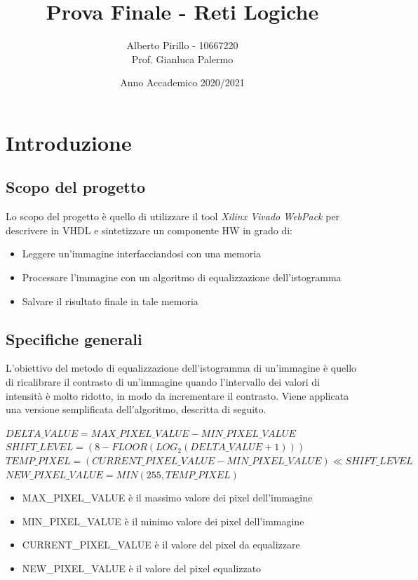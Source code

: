 \documentclass[a4paper, 12pt]{article}
\title{\Huge{Prova Finale - Reti Logiche}}
\author{\Large{Alberto Pirillo - 10667220} \\ \Large{Prof. Gianluca Palermo}}
\date{Anno Accademico 2020/2021}
\begin{document}
\maketitle
\tableofcontents
{}
\pagebreak

\section{Introduzione}
\subsection{Scopo del progetto}
Lo scopo del progetto è quello di utilizzare il tool \textit{Xilinx Vivado WebPack} per  descrivere in VHDL e sintetizzare un componente HW in grado di:
\begin{itemize}
    \item Leggere un'immagine interfacciandosi con una memoria
    \item Processare l'immagine con un algoritmo di equalizzazione dell'istogramma
    \item Salvare il risultato finale in tale memoria
\end{itemize}

\subsection{Specifiche generali}
L'obiettivo del metodo di equalizzazione dell'istogramma di un'immagine è quello di ricalibrare il contrasto di un'immagine quando l'intervallo dei valori di intensità è molto ridotto, in modo da incrementare il contrasto. Viene applicata una versione semplificata dell'algoritmo, descritta di seguito.

\bigskip\footnotesize
$DELTA\_VALUE = MAX\_PIXEL\_VALUE - MIN\_PIXEL\_VALUE$ \\
$SHIFT\_LEVEL = (8-FLOOR(LOG_2(DELTA\_VALUE + 1)))$ \\
$TEMP\_PIXEL = (CURRENT\_PIXEL\_VALUE - MIN\_PIXEL\_VALUE) \ll SHIFT\_LEVEL$ \\
$NEW\_PIXEL\_VALUE = MIN(255, TEMP\_PIXEL)$
\bigskip\normalsize

\begin{itemize}
    \item MAX\_PIXEL\_VALUE è il massimo valore dei pixel dell'immagine
    \item MIN\_PIXEL\_VALUE è il minimo valore dei pixel dell'immagine
    \item CURRENT\_PIXEL\_VALUE è il valore del pixel da equalizzare 
    \item NEW\_PIXEL\_VALUE è il valore del pixel equalizzato
\end{itemize}
\end{document}
